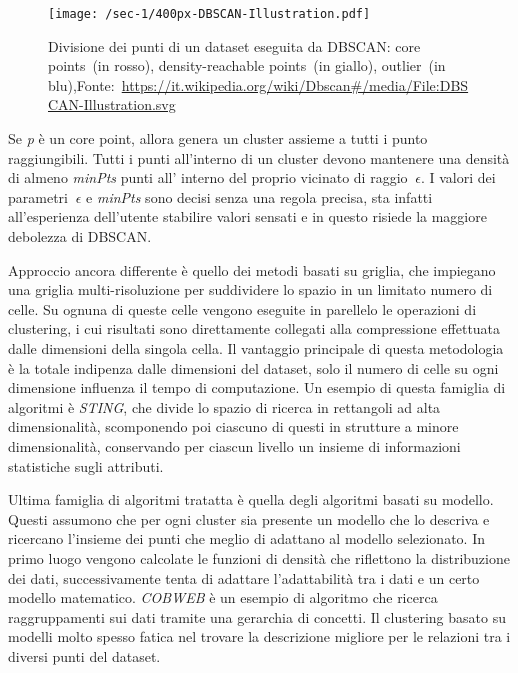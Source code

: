 \begin{figure}
  \centering
  \texttt{[image: /sec-1/400px-DBSCAN-Illustration.pdf]}
  \caption{Divisione dei punti di un dataset eseguita da DBSCAN: core points~(in rosso), density-reachable points~(in giallo), outlier~(in blu),Fonte:~\url{https://it.wikipedia.org/wiki/Dbscan\#/media/File:DBSCAN-Illustration.svg}}%
  \label{fig:chap-1:dbscan-points}
\end{figure}

Se \textit{p} è un core point, allora genera un cluster assieme a tutti i punto raggiungibili.
Tutti i punti all'interno di un cluster devono mantenere una densità di almeno \textit{minPts} punti all'
interno del proprio vicinato di raggio \(~\epsilon \).
I valori dei parametri \(~\epsilon \) e \textit{minPts} sono decisi senza una regola precisa, sta infatti all'esperienza dell'utente stabilire valori sensati e in questo risiede la maggiore debolezza di DBSCAN\@.

Approccio ancora differente è quello dei metodi basati su griglia, che impiegano una griglia multi-risoluzione
per suddividere lo spazio in un limitato numero di celle.
Su ognuna di queste celle vengono eseguite in parellelo le operazioni di clustering, i cui risultati sono direttamente collegati alla compressione
effettuata dalle dimensioni della singola cella.
Il vantaggio principale di questa metodologia è la totale indipenza dalle dimensioni del dataset, solo il numero di
celle su ogni dimensione influenza il tempo di computazione. Un esempio di questa famiglia di algoritmi è \textit{STING}\cite{wang1997sting},
che divide lo spazio di ricerca in rettangoli ad alta dimensionalità, scomponendo poi ciascuno di questi
in strutture a minore dimensionalità, conservando per ciascun livello un insieme di informazioni statistiche sugli attributi.

Ultima famiglia di algoritmi tratatta è quella degli algoritmi basati su modello. Questi assumono
che per ogni cluster sia presente un modello che lo descriva e ricercano l'insieme dei punti che meglio di adattano
al modello selezionato. In primo luogo vengono calcolate le funzioni di densità che riflettono la distribuzione dei dati,
successivamente tenta di adattare l'adattabilità tra i dati e un certo modello matematico. \textit{COBWEB}\cite{fisher1987knowledge} è
un esempio di algoritmo che ricerca raggruppamenti sui dati tramite una gerarchia di concetti.
Il clustering basato su modelli molto spesso fatica nel trovare la descrizione migliore per le relazioni tra i diversi punti del dataset.






